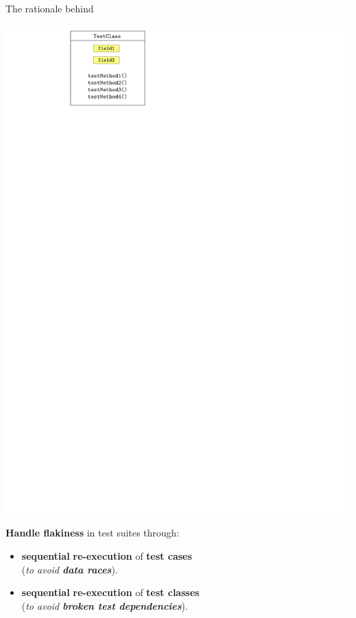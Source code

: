 \documentclass{beamer}
\begin{document}
{\begin{frame}{The rationale behind \textbf{\tname}}
\begin{center}
\begin{minipage}{0.48\linewidth}
			\includegraphics[width=\linewidth,page=6]{images/flakes.pdf}
		\end{minipage}\pause
		\begin{tcolorbox}
			\vfill
			\textbf{Handle flakiness} in test suites through:
			\begin{itemize}
				\item{\textbf{sequential} {\color{blue}\textbf{re-execution}} of \textbf{\color{indiagreen}test cases} \\({\textit{to avoid {\color{red}\textbf{data races}}}}).}
				\item{\textbf{sequential} {\color{blue}\textbf{re-execution}} of \textbf{\color{indiagreen}test classes} \\({\textit{to avoid {\color{red}\textbf{broken test dependencies}}}}).}
			\end{itemize}
		\end{tcolorbox}
	\end{center}
\end{frame}

}
\end{document}
